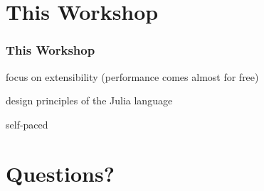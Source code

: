 \documentclass[notes]{beamer}
\newenvironment{wideitemize}{
    \itemize\addtolength{\itemsep}{15pt}\addtolength{\topsep}{10pt}}{\enditemize}
\begin{document}
	\section{This Workshop}

    \begin{frame}
        \frametitle{This Workshop}
        \begin{wideitemize}
            \item focus on extensibility (performance comes almost for free)
            \item design principles of the Julia language
            \item self-paced
        \end{wideitemize}
    \end{frame}

    \section{Questions?}
\end{document}
